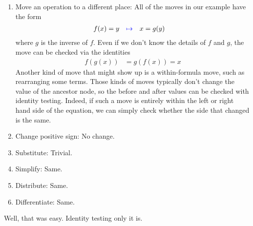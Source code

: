 \documentclass[11pt]{article}
\newcommand{\blue}[1]{{\color{blue} #1}}
\begin{document}
\begin{enumerate}
\item \blue{Move an operation to a different place:} All of the moves in our example have
the form
\begin{align*}
f(x) = y \quad&\blue{\mapsto}\quad x = g(y)
\end{align*}
where $g$ is the inverse of $f$.  Even if we don't know the details of $f$ and $g$, the move can be
checked via the identities
\begin{align*}
f(g(x)) &= g(f(x)) = x
\end{align*}
Another kind of move that might show up is a within-formula move, such as rearranging some terms.
Those kinds of moves typically don't change the value of the ancestor node, so the before and after
values can be checked with identity testing.  Indeed, if such a move is entirely within the left or
right hand side of the equation, we can simply check whether the side that changed is the same.

\item \blue{Change positive sign:} No change.
\item \blue{Substitute:} Trivial.
\item \blue{Simplify:} Same.
\item \blue{Distribute:} Same.
\item \blue{Differentiate:} Same.
\end{enumerate}

Well, that was easy.  Identity testing only it is.
\end{document}
